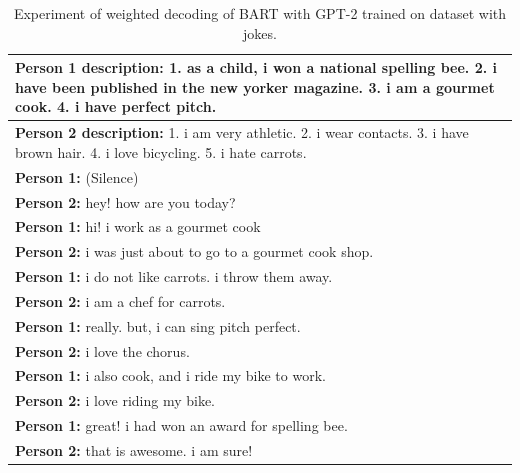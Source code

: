 \begin{table}[ht]
\centering
 \begin{tabular}{|p{14cm}|} 
 \hline\hline
 \textbf{Person 1 description:} 1. as a child, i won a national spelling bee. 2. i have been published in the new yorker magazine. 3. i am a gourmet cook. 4. i have perfect pitch. \\
 \hline
 \textbf{Person 2 description:} 1. i am very athletic. 2. i wear contacts. 3. i have brown hair. 4. i love bicycling. 5. i hate carrots. \\
 \hline\hline
 \textbf{Person 1:} (Silence) \\
 \textbf{Person 2:} hey! how are you today? \\ 
 \textbf{Person 1:} hi! i work as a gourmet cook \\
 \textbf{Person 2:} i was just about to go to a gourmet cook shop. \\
 \textbf{Person 1:} i do not like carrots. i throw them away. \\
 \textbf{Person 2:} i am a chef for carrots.\\
 \textbf{Person 1:} really. but, i can sing pitch perfect. \\
 \textbf{Person 2:} i love the chorus. \\
 \textbf{Person 1:} i also cook, and i ride my bike to work. \\
 \textbf{Person 2:} i love riding my bike. \\
 \textbf{Person 1:} great! i had won an award for spelling bee. \\
 \textbf{Person 2:} that is awesome. i am sure! \\
 \hline\hline
 \end{tabular}
 \caption{Experiment of weighted decoding of BART with GPT-2 trained on dataset with jokes.}
\label{tab:bart_conversation_gpt2}
\end{table}

